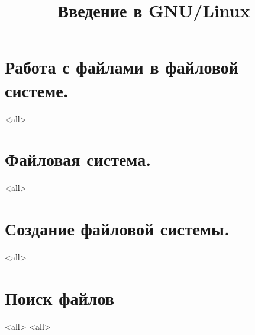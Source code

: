 

\title{Введение в GNU/Linux}




\begin{frame}
	\frametitle{}
	\titlepage
	\vspace{-0.5cm}
	\begin{center}
	\end{center}
\end{frame}


\begin{frame}
	\tableofcontents
	[hideallsubsections]
\end{frame}


\section{Работа с файлами в файловой системе.}
\mode<all>{}
\section{Файловая система.}
\mode<all>{}
\section{Создание файловой системы.}
\mode<all>{}
\section{Поиск файлов}
\mode<all>{}
\mode<all>{}

\bye

